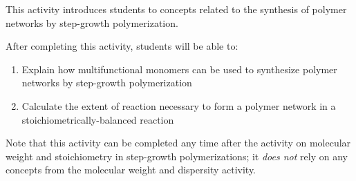 %
%
%
%

\renewcommand{\figpath}{content/polymchem/networks/network-stepgrowth/figs}
\renewcommand{\labelbase}{network-stepgrowth}

\begin{activity}

\begin{instructornotes}
	This activity introduces students to concepts related to the synthesis of polymer networks by step-growth polymerization.
	
	After completing this activity, students will be able to:
	\begin{enumerate}
		\item Explain how multifunctional monomers can be used to synthesize polymer networks by step-growth polymerization
		\item Calculate the extent of reaction necessary to form a polymer network in a stoichiometrically-balanced reaction
	\end{enumerate}
	
	Note that this activity can be completed any time after the activity on molecular weight and stoichiometry in step-growth polymerizations; it \emph{does not} rely on any concepts from the molecular weight and dispersity activity.
	

\end{instructornotes}
\end{activity}
